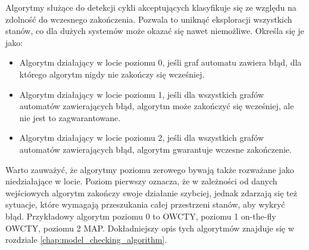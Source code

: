 Algorytmy służące do detekcji cykli akceptujących klasyfikuje się ze względu na zdolność do wczesnego zakończenia.
Pozwala to uniknąć eksploracji wszystkich stanów, co dla dużych systemów może okazać się nawet niemożliwe.
Określa się je jako:
\begin{itemize}
\item Algorytm działający w locie poziomu 0, jeśli graf automatu zawiera błąd, dla którego algorytm nigdy nie zakończy się wcześniej.
\item Algorytm działający w locie poziomu 1, jeśli dla wszystkich grafów automatów zawierających błąd, algorytm może zakończyć  się wcześniej, ale nie jest to zagwarantowane.
\item Algorytm działający w locie poziomu 2, jeśli dla wszystkich grafów automatów zawierających błąd, algorytm gwarantuje wczesne zakończenie.
\end{itemize}
Warto zauważyć, że algorytmy poziomu zerowego bywają także rozważane jako niedziałające w locie.
Poziom pierwszy oznacza, że w zależności od danych wejściowych algorytm zakończy swoje działanie szybciej, jednak zdarzają się też sytuacje, które wymagają przeszukania całej przestrzeni stanów, aby wykryć błąd.
Przykładowy algorytm poziomu 0 to OWCTY, poziomu 1 on-the-fly OWCTY, poziomu 2 MAP.
Dokładniejszy opis tych algorytmów znajduje się w rozdziale \ref{chap:model_checking_algorithm}.
